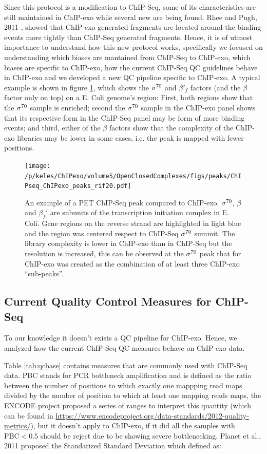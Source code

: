 \documentclass[11pt]{article}\usepackage[]{graphicx}\usepackage[]{color}
\begin{document}
Since this protocol is a modification to ChIP-Seq, some of its
characteristics are still maintained in ChIP-exo while several new are
being found. Rhee and Pugh, 2011 \cite{exo1}, showed that ChIP-exo
generated fragments are located around the binding events more tightly
than ChIP-Seq generated fragments. Hence, it is of utmost importance
to understand how this new protocol works, specifically we focused on
understanding which biases are mantained from ChIP-Seq to ChIP-exo,
which biases are specific to ChIP-exo, how the current ChIP-Seq QC
guidelines behave in ChIP-exo and we developed a new QC pipeline
specific to ChIP-exo. A typical example is shown in figure
\ref{fig:exo_example}, which shows the $\sigma^{70}$ and $\beta'_f$ factors
(and the $\beta$ factor only on top) on a E. Coli genome's region:
First, both regions show that the $\sigma^{70}$ sample is enriched; second
the $\sigma^{70}$ sample in the ChIP-exo panel shows that its respective form
in the ChIP-Seq panel may be form of more binding events; and third,
either of the $\beta$ factors show that the complexity of the ChIP-exo
libraries may be lower in some cases, i.e. the peak is mapped with
fewer positions.

\begin{figure}[H]
  \centering
  \texttt{[image: /p/keles/ChIPexo/volume5/OpenClosedComplexes/figs/peaks/ChIPseq\_ChIPexo\_peaks\_rif20.pdf]}
  \caption{An example of a PET ChIP-Seq peak compared to
    ChIP-exo. $\sigma^{70}$, $\beta$ and $\beta_f'$ are subunits of
    the transcription initiation complex in E. Coli. Gene regions on
    the reverse strand are highlighted in light blue and the region
    was centered respect to ChIP-Seq $\sigma^{70}$ summit. The library
    complexity is lower in ChIP-exo than in ChIP-Seq but the
    resolution is increased, this can be observed at the $\sigma^{70}$
    peak that for ChIP-exo was created as the combination of at least
    three ChIP-exo ``sub-peaks''.}
  \label{fig:exo_example}
\end{figure}

\subsection{Current Quality Control Measures for ChIP-Seq}
\label{sec:QC_chipseq}

To our knowledge it doesn't exists a QC pipeline for ChIP-exo. Hence,
we analyzed how the current ChIP-Seq QC measures behave on ChIP-exo
data.

Table \ref{tab:qcbase} contains measures that are commonly used with
ChIP-Seq data. PBC stands for PCR bottleneck amplification and is
defined as the ratio between the number of positions to which exactly
one mappping read maps divided by the number of position to which at
least one mapping reads maps, the ENCODE project proposed a series of
ranges to interpret this quantity (which can be found in
\url{https://www.encodeproject.org/data-standards/2012-quality-metrics/}),
but it doesn't apply to ChIP-exo, if it did all the samples with
$\mbox{PBC} < 0.5$ should be reject due to be showing severe
bottlenecking. Planet et al., 2011 proposed the Standarized Standard
Deviation which defined as:
\end{document}
